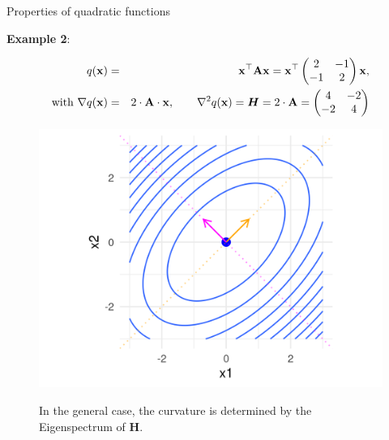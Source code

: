   
  \begin{frame}{Properties of quadratic functions}
  
  \textbf{Example 2}:
  
  \vspace*{-0.3cm}
  
  \begin{eqnarray*}
    q(\mathbf{x}) &=& \mathbf{x}^\top \mathbf{A} \mathbf{x} = \mathbf{x}^\top\begin{pmatrix} 2 & -1 \\ -1 & 2\end{pmatrix} \mathbf{x}, \\
    \text{with } \nabla q(\mathbf{x}) &=& 2 \cdot \mathbf{A} \cdot \mathbf{x}, \qquad
    \nabla^2 q(\mathbf{x}) = \bm{H} = 2 \cdot \mathbf{A} = \begin{pmatrix} 4 & -2 \\ -2 & 4\end{pmatrix} 
  \end{eqnarray*}
  
  
  
   {
    \begin{figure}
      \includegraphics[height=0.35\textwidth, keepaspectratio]{figure_man/quadratic_functions_2D_example_1_7.png} \\
      \begin{footnotesize} 
        In the general case, the curvature is determined by the Eigenspectrum of $\bm{H}$. 
      \end{footnotesize}
    \end{figure}
  
}
\end{frame}
